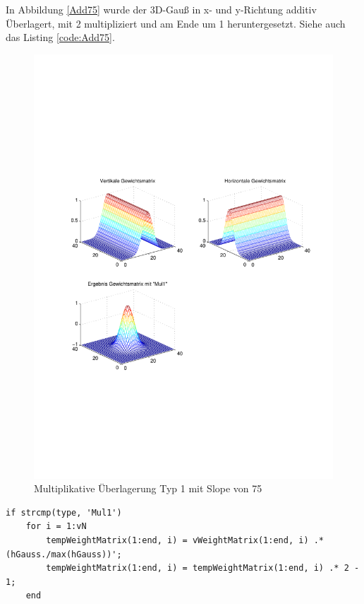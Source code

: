 In Abbildung \ref{Add75} wurde der 3D-Gauß in x- und y-Richtung additiv Überlagert, mit 2 multipliziert und am Ende um 1 heruntergesetzt. Siehe auch das Listing \ref{code:Add75}.

\newpage
\begin{figure}[hbt]
	\centering
	\includegraphics[width=1\linewidth]{./Bilder/Auswertung/GewichtmatrixEinzelschritte/Endergebnis_Gewichtsmatrix_Slope_75_Type_Mul1}
	\caption{Multiplikative Überlagerung Typ 1 mit Slope von 75}
	\label{Mul175}
\end{figure}

\begin{lstlisting}[label=code:Mul175, caption=Auszug Matlab-Skript 'GetGaussWeights()']
if strcmp(type, 'Mul1')
	for i = 1:vN
		tempWeightMatrix(1:end, i) = vWeightMatrix(1:end, i) .* (hGauss./max(hGauss))';
		tempWeightMatrix(1:end, i) = tempWeightMatrix(1:end, i) .* 2 - 1;
	end
\end{lstlisting}

